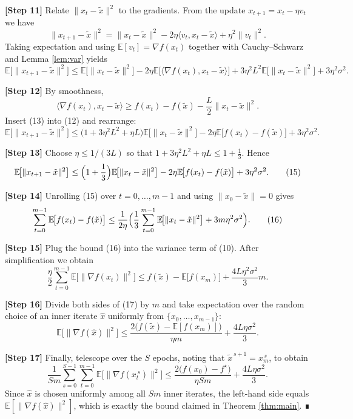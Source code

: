 \documentclass{article}
\newcommand{\E}{\mathbb{E}}
\begin{document}
\noindent\textbf{[Step 11]} Relate $\|x_t-\tilde{x}\|^{2}$ to the gradients.  From the update $x_{t+1}=x_t-\eta v_t$ we have
\[
\|x_{t+1}-\tilde{x}\|^{2}
=\|x_t-\tilde{x}\|^{2}-2\eta\langle v_t,x_t-\tilde{x}\rangle+\eta^{2}\|v_t\|^{2}.
\tag{11}
\]
Taking expectation and using $\E[v_t]=\nabla f(x_t)$ together with Cauchy–Schwarz and Lemma \ref{lem:var} yields
\[
\E\!\bigl[\|x_{t+1}-\tilde{x}\|^{2}\bigr]
\le \E\!\bigl[\|x_t-\tilde{x}\|^{2}\bigr]
-2\eta\E\!\bigl[\langle\nabla f(x_t),x_t-\tilde{x}\rangle\bigr]
+3\eta^{2}L^{2}\E\!\bigl[\|x_t-\tilde{x}\|^{2}\bigr]
+3\eta^{2}\sigma^{2}.
\tag{12}
\]

\noindent\textbf{[Step 12]} By smoothness,
\[
\langle\nabla f(x_t),x_t-\tilde{x}\rangle\ge f(x_t)-f(\tilde{x})-\frac{L}{2}\|x_t-\tilde{x}\|^{2}.
\tag{13}
\]
Insert (13) into (12) and rearrange:
\[
\E\!\bigl[\|x_{t+1}-\tilde{x}\|^{2}\bigr]
\le\bigl(1+3\eta^{2}L^{2}+ \eta L\bigr)\E\!\bigl[\|x_t-\tilde{x}\|^{2}\bigr]
-2\eta\E\!\bigl[f(x_t)-f(\tilde{x})\bigr]
+3\eta^{2}\sigma^{2}.
\tag{14}
\]

\noindent\textbf{[Step 13]} Choose $\eta\le 1/(3L)$ so that $1+3\eta^{2}L^{2}+ \eta L\le 1+\frac{1}{3}$.  Hence
\[
\E\!\bigl[\|x_{t+1}-\tilde{x}\|^{2}\bigr]
\le \Bigl(1+\frac13\Bigr)\E\!\bigl[\|x_t-\tilde{x}\|^{2}\bigr]
-2\eta\E\!\bigl[f(x_t)-f(\tilde{x})\bigr]
+3\eta^{2}\sigma^{2}.
\tag{15}
\]

\noindent\textbf{[Step 14]} Unrolling (15) over $t=0,\dots,m-1$ and using $\|x_0-\tilde{x}\|=0$ gives
\[
\sum_{t=0}^{m-1}\E\!\bigl[f(x_t)-f(\tilde{x})\bigr]
\le \frac{1}{2\eta}\Bigl(\frac13\sum_{t=0}^{m-1}\E\!\bigl[\|x_t-\tilde{x}\|^{2}\bigr]+3m\eta^{2}\sigma^{2}\Bigr).
\tag{16}
\]

\noindent\textbf{[Step 15]} Plug the bound (16) into the variance term of (10).  After simplification we obtain
\[
\frac{\eta}{2}\sum_{t=0}^{m-1}\E\!\bigl[\|\nabla f(x_t)\|^{2}\bigr]
\le f(\tilde{x})- \E\!\bigl[f(x_m)\bigr] +\frac{4L\eta^{2}\sigma^{2}}{3}m .
\tag{17}
\]

\noindent\textbf{[Step 16]} Divide both sides of (17) by $m$ and take expectation over the random choice of an inner iterate $\hat{x}$ uniformly from $\{x_0,\dots,x_{m-1}\}$:
\[
\E\!\bigl[\|\nabla f(\hat{x})\|^{2}\bigr]
\le \frac{2\bigl(f(\tilde{x})- \E[f(x_m)]\bigr)}{\eta m}
+\frac{4L\eta\sigma^{2}}{3}.
\tag{18}
\]

\noindent\textbf{[Step 17]} Finally, telescope over the $S$ epochs, noting that $\tilde{x}^{\,s+1}=x_{m}^{\,s}$, to obtain
\[
\frac{1}{S m}\sum_{s=0}^{S-1}\sum_{t=0}^{m-1}
\E\!\bigl[\|\nabla f(x_t^{\,s})\|^{2}\bigr]
\le \frac{2\bigl(f(x_0)-f^{\star}\bigr)}{\eta S m}
+\frac{4L\eta\sigma^{2}}{3}.
\]
Since $\hat{x}$ is chosen uniformly among all $S m$ inner iterates, the left‑hand side equals $\E[\|\nabla f(\hat{x})\|^{2}]$, which is exactly the bound claimed in Theorem \ref{thm:main}.  ∎
\end{document}
